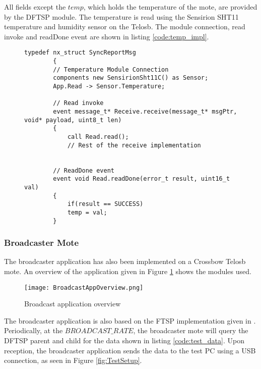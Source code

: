 \documentclass[Main]{subfiles}
\begin{document}
				All fields except the $temp$, which holds the temperature of the mote, are provided by the DFTSP module.
				The temperature is read using the Sensirion SHT11\cite{tempSensorDatasheet} temperature and humidity sensor on the Telosb.
				The module connection, read invoke and readDone event are shown in listing \ref{code:temp_impl}.

				\begin{figure}[H]
					\begin{lstlisting}[caption=Temperature reading implementation, style=Code-C, label=code:temp_impl]
		typedef nx_struct SyncReportMsg
		{
		// Temperature Module Connection
		components new SensirionSht11C() as Sensor;
		App.Read -> Sensor.Temperature;

		// Read invoke
		event message_t* Receive.receive(message_t* msgPtr, void* payload, uint8_t len)
		{
	    	call Read.read();
	    	// Rest of the receive implementation


		// ReadDone event
		event void Read.readDone(error_t result, uint16_t val)
		{
			if(result == SUCCESS)
			temp = val;
		}

						\end{lstlisting}
				\end{figure}
		
		
		\subsubsection{Broadcaster Mote} %
		\label{sub:broadcaster_mote}
			The broadcaster application has also been implemented on a Crossbow Telosb mote. 
			An overview of the application given in Figure \ref{fig:broadCastAppOverview} shows the modules used. 

			\begin{figure}[H]
				\centering
				\texttt{[image: BroadcastAppOverview.png]}
				\caption{Broadcast application overview}
				\label{fig:broadCastAppOverview}
			\end{figure}

			The broadcaster application is also based on the FTSP implementation given in \cite{FTSPImplementationTinyOS:Online}.	
			Periodically, at the $BROADCAST\_RATE$, the broadcaster mote will query the DFTSP parent and child for the data shown in listing \ref{code:test_data}.
			Upon reception, the broadcaster application sends the data to the test PC using a USB connection, as seen in Figure \ref{fig:TestSetup}.
\end{document}
